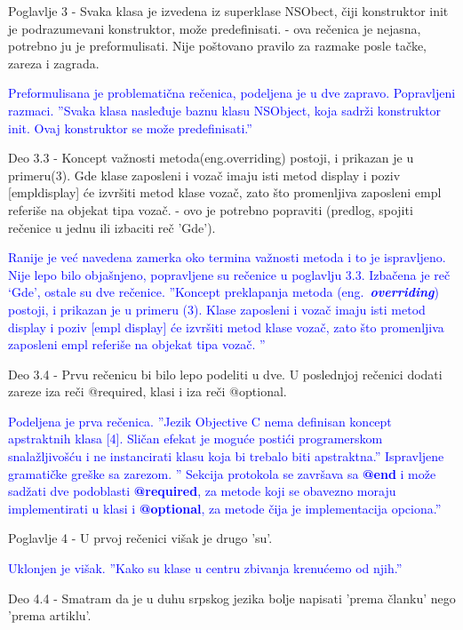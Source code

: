 \documentclass[a4paper]{report}
\newcommand{\odgovor}[1]{\textcolor{blue}{#1}}
\begin{document}
Poglavlje 3 - Svaka klasa je izvedena iz superklase NSObect, \v ciji konstruktor init je podrazumevani konstruktor, mo\v ze predefinisati. - ova re\v cenica je nejasna, potrebno ju je preformulisati. Nije po\v stovano pravilo za razmake posle ta\v cke, zareza i zagrada.

\odgovor{
Preformulisana je problematična rečenica, podeljena je u dve zapravo. Popravljeni razmaci.
''Svaka klasa nasleđuje baznu klasu NSObject, koja sadrži konstruktor init. Ovaj konstruktor se može predefinisati.''
}

Deo 3.3 - Koncept va\v znosti metoda(eng.overriding) postoji, i prikazan je u primeru(3). Gde klase zaposleni i voza\v c imaju isti metod display i poziv [empldisplay] \'ce izvr\v siti metod klase voza\v c, zato \v sto promenljiva zaposleni empl referi\v se na objekat tipa voza\v c. - ovo je potrebno popraviti (predlog, spojiti re\v cenice u jednu ili izbaciti re\v c 'Gde').

\odgovor{
Ranije je već navedena zamerka oko termina važnosti metoda i to je ispravljeno. Nije lepo bilo objašnjeno, popravljene su rečenice u poglavlju 3.3. Izbačena je reč `Gde', ostale su dve rečenice. ''Koncept preklapanja metoda (eng.~\textbf{\em overriding})  postoji, i prikazan je u primeru (3). Klase zaposleni i vozač imaju isti metod display i poziv [empl display] će izvršiti metod klase vozač, zato što promenljiva zaposleni empl referiše na objekat tipa vozač. ''
}

Deo 3.4 - Prvu re\v cenicu bi bilo lepo podeliti u dve. U poslednjoj re\v cenici dodati zareze iza re\v ci @required, klasi i iza re\v ci @optional.

\odgovor{
Podeljena je prva rečenica.
''Jezik Objective C nema definisan koncept apstraktnih klasa [4]. Sličan efekat je moguće postići programerskom snalažljivošću i ne instancirati klasu koja bi trebalo biti apstraktna.''
Ispravljene gramatičke greške sa zarezom.
'' Sekcija protokola se završava sa \textbf{@end} i može sadžati dve podoblasti \textbf{@required}, za metode koji se obavezno moraju implementirati u klasi i \textbf{@optional}, za metode čija je implementacija opciona.''
}

Poglavlje 4 - U prvoj re\v cenici vi\v sak je drugo 'su'.

\odgovor{
Uklonjen je višak. ''Kako su klase u centru zbivanja krenućemo od njih.''
}

Deo 4.4 - Smatram da je u duhu srpskog jezika bolje napisati 'prema \v clanku' nego 'prema artiklu'.
\end{document}

